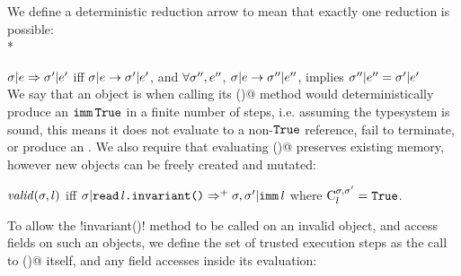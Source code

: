%
%
We define a deterministic reduction arrow to mean that exactly one reduction is possible:\\*

$\s|e \Rightarrow \s'|e'$ iff $\s|e \rightarrow \s'|e'$, and $\forall \s'', e''$, $\s|e \rightarrow \s''|e''$, implies $\s''|e'' = \s'|e'$\\

\noindent We say that an object is \valid when calling its \Q@invariant()@ method would
deterministically produce an $\Kw{imm}\,\Kw{True}$ in a finite number of steps, i.e. assuming the typesystem is sound, this means it does not evaluate to a non-$\Kw{True}$ reference, fail to terminate, or produce an \error.
We also require that evaluating \Q@invariant()@ preserves existing memory, however new objects can be freely created and mutated:

\indent$\valid(\s,l)$ iff $\s | \invariant{l} \Rightarrow^+ \s,\s' | \Kw{imm}\,l$ where  $\C[\s,\s']{l} = \Kw{True}$.%

\noindent
To allow the \Q!invariant()! method to be called on an invalid object, and access fields on such an objects, we define the set of trusted execution steps as the call to \Q@invariant()@ itself, and any field accesses inside its evaluation:

